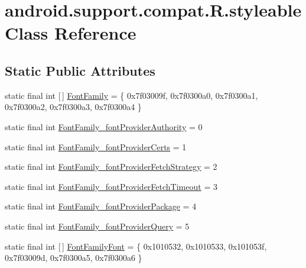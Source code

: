 \hypertarget{classandroid_1_1support_1_1compat_1_1_r_1_1styleable}{}\section{android.\+support.\+compat.\+R.\+styleable Class Reference}
\label{classandroid_1_1support_1_1compat_1_1_r_1_1styleable}
\subsection*{Static Public Attributes}
\begin{DoxyCompactItemize}
\item 
static final int \mbox{[}$\,$\mbox{]} \mbox{\hyperlink{classandroid_1_1support_1_1compat_1_1_r_1_1styleable_abb9d6768feb73ebc5eb00aa944cde5cd}{Font\+Family}} = \{ 0x7f03009f, 0x7f0300a0, 0x7f0300a1, 0x7f0300a2, 0x7f0300a3, 0x7f0300a4 \}
\item 
static final int \mbox{\hyperlink{classandroid_1_1support_1_1compat_1_1_r_1_1styleable_a79aa91648cdc2eb4f7c8638b4a03ce58}{Font\+Family\+\_\+font\+Provider\+Authority}} = 0
\item 
static final int \mbox{\hyperlink{classandroid_1_1support_1_1compat_1_1_r_1_1styleable_ad5b1b877aab2bc12d0509032d17c28ca}{Font\+Family\+\_\+font\+Provider\+Certs}} = 1
\item 
static final int \mbox{\hyperlink{classandroid_1_1support_1_1compat_1_1_r_1_1styleable_a0c3689e4bcd35b8d8cec425bbfb7a24b}{Font\+Family\+\_\+font\+Provider\+Fetch\+Strategy}} = 2
\item 
static final int \mbox{\hyperlink{classandroid_1_1support_1_1compat_1_1_r_1_1styleable_ae1f72343c44ad91714a7d4be3ca60310}{Font\+Family\+\_\+font\+Provider\+Fetch\+Timeout}} = 3
\item 
static final int \mbox{\hyperlink{classandroid_1_1support_1_1compat_1_1_r_1_1styleable_a5462df624de1f9ad89e776c875bfd219}{Font\+Family\+\_\+font\+Provider\+Package}} = 4
\item 
static final int \mbox{\hyperlink{classandroid_1_1support_1_1compat_1_1_r_1_1styleable_aa23d02aec92c84ae6af10f4884ae45d5}{Font\+Family\+\_\+font\+Provider\+Query}} = 5
\item 
static final int \mbox{[}$\,$\mbox{]} \mbox{\hyperlink{classandroid_1_1support_1_1compat_1_1_r_1_1styleable_a751b3f66192df6e0e2ae522e910b0a9c}{Font\+Family\+Font}} = \{ 0x1010532, 0x1010533, 0x101053f, 0x7f03009d, 0x7f0300a5, 0x7f0300a6 \}
\item 

\end{DoxyCompactItemize}
